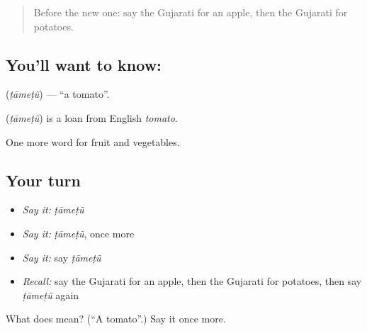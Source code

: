 \label{lesson:GU-C59-tomato}



\begin{quote}
Before the new one: say the Gujarati for an apple, then the Gujarati for potatoes.
\end{quote}

\subsection*{You'll want to know: }
\textbf{} (\emph{ṭāmeṭũ}) — \textquotedblleft{}a tomato\textquotedblright{}.

\begin{cousinweb}
\textbf{} (\emph{ṭāmeṭũ}) is a loan from English \emph{tomato}.
\end{cousinweb}

\begin{grammarlens}[title={What you've built}]
One more word for fruit and vegetables.
\end{grammarlens}

\subsection*{Your turn}
\begin{itemize}
\raggedright
  \item \emph{Say it:} \emph{ṭāmeṭũ}
  \item \emph{Say it:} \emph{ṭāmeṭũ}, once more
  \item \emph{Say it:} say \emph{ṭāmeṭũ}
  \item \emph{Recall:} say the Gujarati for an apple, then the Gujarati for potatoes, then say \emph{ṭāmeṭũ} again
\end{itemize}

\begin{tcolorbox}[breakable,colback=teal!4,colframe=teal!35!black,title={Before you move on}]
What does  mean? (\textquotedblleft{}A tomato\textquotedblright{}.) Say it once more.
\end{tcolorbox}
